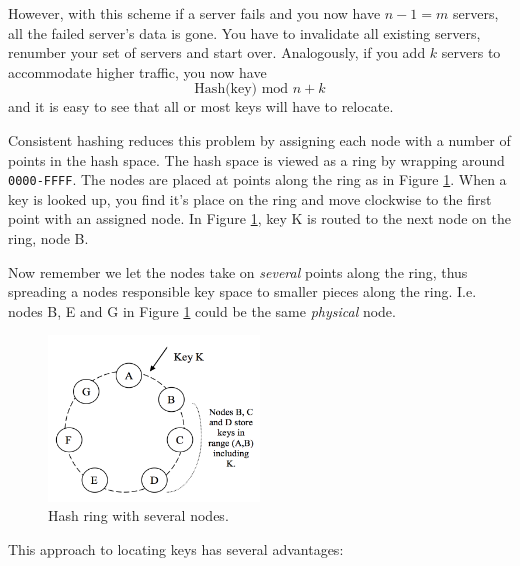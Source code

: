 However, with this scheme if a server fails and you now have $n-1=m$ servers, all the failed server's data is gone.
You have to invalidate all existing servers, renumber your set of servers and start over.
Analogously, if you add $k$ servers to accommodate higher traffic, you now have $$\textrm{Hash(key) mod } n + k$$ and it is easy to see that all or most keys will have to relocate.

Consistent hashing reduces this problem by assigning each node with a number of points in the hash space.
The hash space is viewed as a ring by wrapping around \texttt{0000-FFFF}. The nodes are placed at points along the ring as in Figure \ref{fig:hashring}. When a key is looked up, you find it's place on the ring and move clockwise to the first point with an assigned node. In Figure \ref{fig:hashring}, key K is routed to the next node on the ring, node B.

Now remember we let the nodes take on \emph{several} points along the ring, thus spreading a nodes responsible key space to smaller pieces along the ring.
I.e. nodes B, E and G in Figure \ref{fig:hashring} could be the same \emph{physical} node.

\begin{figure}[h]
    \centering
    \includegraphics[width=0.5\textwidth]{background/figures/hashring}
    \caption{Hash ring with several nodes\cite{dynamo}.}
    \label{fig:hashring}
\end{figure}

This approach to locating keys has several advantages:

